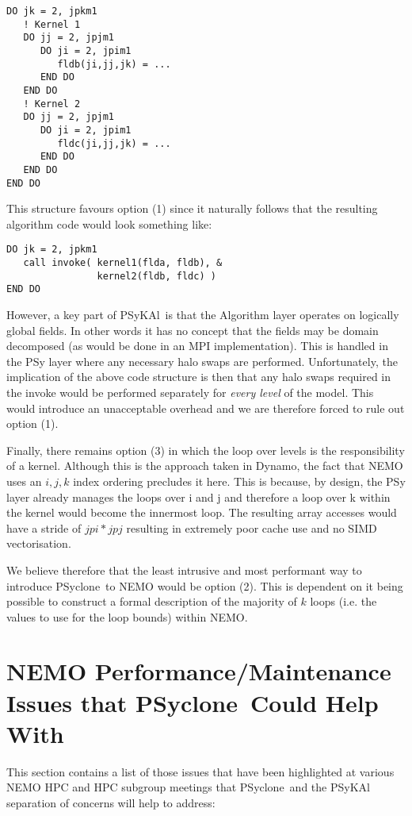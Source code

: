 \documentclass{article}
\newcommand{\psykal}{{PS}y{KA}l}
\newcommand{\psyclone}{{PS}yclone}
\begin{document}
\begin{verbatim}
DO jk = 2, jpkm1
   ! Kernel 1
   DO jj = 2, jpjm1
      DO ji = 2, jpim1
         fldb(ji,jj,jk) = ...
      END DO
   END DO
   ! Kernel 2
   DO jj = 2, jpjm1
      DO ji = 2, jpim1
         fldc(ji,jj,jk) = ...
      END DO
   END DO
END DO
\end{verbatim}

This structure favours option (1) since it naturally follows that the
resulting algorithm code would look something like:

\begin{verbatim}
DO jk = 2, jpkm1
   call invoke( kernel1(flda, fldb), &
                kernel2(fldb, fldc) )
END DO
\end{verbatim}

However, a key part of \psykal\ is that the Algorithm layer operates on
logically global fields. In other words it has no concept that the
fields may be domain decomposed (as would be done in an MPI
implementation). This is handled in the PSy layer where any necessary
halo swaps are performed. Unfortunately, the implication of the above
code structure is then that any halo swaps required in the invoke
would be performed separately for \emph{every level} of the
model. This would introduce an unacceptable overhead and we are
therefore forced to rule out option (1).

Finally, there remains option (3) in which the loop over levels is the
responsibility of a kernel. Although this is the approach taken in
Dynamo, the fact that NEMO uses an $i,j,k$ index ordering precludes it
here. This is because, by design, the PSy layer already manages the
loops over i and j and therefore a loop over k within the kernel would
become the innermost loop. The resulting array accesses would have a
stride of $jpi*jpj$ resulting in extremely poor cache use and no SIMD
vectorisation.

We believe therefore that the least intrusive and most performant way
to introduce \psyclone\ to NEMO would be option (2). This is dependent
on it being possible to construct a formal description of the majority
of $k$ loops (i.e. the values to use for the loop bounds) within NEMO.

\section{NEMO Performance/Maintenance Issues that \psyclone\ Could Help With}

This section contains a list of those issues that have been
highlighted at various NEMO HPC and HPC subgroup meetings that
\psyclone\ and the PSyKAl separation of concerns will help to address:
\end{document}
